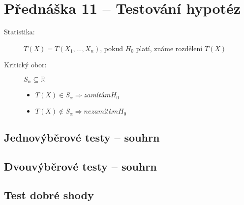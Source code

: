 \section{Přednáška 11 -- Testování hypotéz}

\begin{description}
    \item[Statistika:] $T(X) = T(X_1, \dots, X_n)$, pokud $H_0$ platí, známe rozdělení $T(X)$
    \item[Kritický obor:] $S_{\alpha}\subseteq \mathbb{R}$
        \begin{itemize}
            \item $T(X) \in S_{\alpha} \Rightarrow zamítám H_0$
            \item $T(X) \notin S_{\alpha} \Rightarrow nezamítám H_0$
        \end{itemize}
\end{description}

\subsection{Jednovýběrové testy -- souhrn}


\subsection{Dvouvýběrové testy -- souhrn}


\subsection{Test dobré shody}

